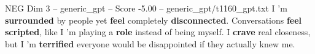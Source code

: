 \begin{textsample}{NEG Dim 3 – generic\_gpt – Score -5.00 – generic\_gpt/t1160\_gpt.txt}  \label{ex:f3_neg_019}
I ’m \textbf{surrounded} by people yet \textbf{feel} completely \textbf{disconnected}.
Conversations \textbf{feel} \textbf{scripted}, like I ’m playing a \textbf{role} instead of being myself.
I \textbf{crave} real closeness, but I ’m \textbf{terrified} everyone would be disappointed if they actually knew me.

\end{textsample}
